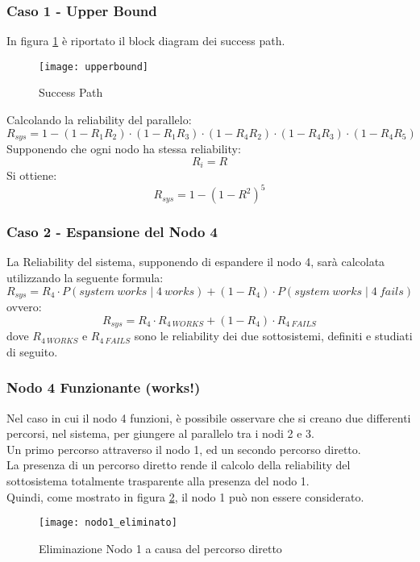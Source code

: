 \clearpage

\subsubsection{Caso 1 - Upper Bound}
In figura \ref{upperbound} è riportato il block diagram dei success path.

\begin{figure}[!htbp]
  \centering
  \texttt{[image: upperbound]}
  \caption{Success Path}
  \label{upperbound}
\end{figure}

Calcolando la reliability del parallelo:
$$R_{sys} = 1-(1-R_1R_2) \cdot (1-R_1R_3) \cdot (1-R_4R_2) \cdot (1-R_4R_3) \cdot (1-R_4R_5)$$
Supponendo che ogni nodo ha stessa reliability: $$R_i = R$$
Si ottiene: $$R_{sys} = 1-(1-R^2)^5$$

\clearpage

\subsubsection{Caso 2 - Espansione del Nodo 4}
La Reliability del sistema, supponendo di espandere il nodo 4, sarà calcolata
utilizzando la seguente formula:
$$R_{sys} = R_4 \cdot P(system\ works \mid 4\ works) + (1-R_4)\cdot P(system\ works \mid 4\ fails)$$
ovvero:
$$R_{sys} = R_4 \cdot R_{4\ WORKS} + (1-R_4)\cdot R_{4\ FAILS}$$
dove $R_{4\ WORKS}$ e $R_{4\ FAILS}$ sono le reliability dei due sottosistemi,
definiti e studiati di seguito.\\
\subsubsection*{Nodo 4 Funzionante (works!)}
Nel caso in cui il nodo 4 funzioni, è possibile osservare che si creano
due differenti percorsi, nel sistema, per giungere al parallelo tra i nodi 2 e 3.\\
Un primo percorso attraverso il nodo 1, ed un secondo percorso diretto.\\
La presenza di un percorso diretto rende il calcolo della reliability del
sottosistema totalmente trasparente alla presenza del nodo 1.\\
Quindi, come mostrato in figura \ref{nodo1_eliminato}, il nodo 1 può non essere
considerato.\\
\begin{figure}[!htbp]
  \centering
  \texttt{[image: nodo1\_eliminato]}
  \caption{Eliminazione Nodo 1 a causa del percorso diretto}
  \label{nodo1_eliminato}
\end{figure}

